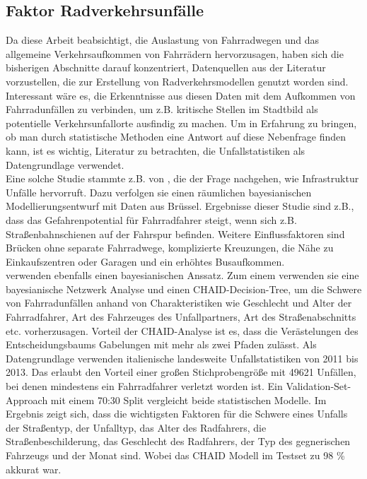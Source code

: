 \documentclass[a4paper,12pt]{thesis}
\begin{document}
\subsection{Faktor Radverkehrsunfälle}

Da diese Arbeit beabsichtigt, die Auslastung von Fahrradwegen und das allgemeine Verkehrsaufkommen von Fahrrädern hervorzusagen, haben sich die bisherigen Abschnitte darauf konzentriert, Datenquellen aus der Literatur vorzustellen, die zur Erstellung von Radverkehrsmodellen genutzt worden sind. Interessant wäre es, die Erkenntnisse aus diesen Daten mit dem Aufkommen von Fahrradunfällen zu verbinden, um z.B. kritische Stellen im Stadtbild als potentielle Verkehrsunfallorte ausfindig zu machen. Um in Erfahrung zu bringen, ob man durch statistische Methoden eine Antwort auf diese Nebenfrage finden kann, ist es wichtig, Literatur zu betrachten, die Unfallstatistiken als Datengrundlage verwendet.\\
Eine solche Studie stammte z.B. von \cite{Vandenbulcke2014}, die der Frage nachgehen, wie Infrastruktur Unfälle hervorruft. Dazu verfolgen sie einen räumlichen bayesianischen Modellierungsentwurf mit Daten aus Brüssel. Ergebnisse dieser Studie sind z.B., dass das Gefahrenpotential für Fahrradfahrer steigt, wenn sich z.B. Straßenbahnschienen auf der Fahrspur befinden. Weitere Einflussfaktoren sind Brücken ohne separate Fahrradwege, komplizierte Kreuzungen, die Nähe zu Einkaufszentren oder Garagen und ein erhöhtes Busaufkommen.\\
\cite{PRATI201744} verwenden ebenfalls einen bayesianischen Anssatz. Zum einem verwenden sie eine bayesianische Netzwerk Analyse und einen CHAID-Decision-Tree, um die Schwere von Fahrradunfällen anhand von Charakteristiken wie Geschlecht und Alter der Fahrradfahrer, Art des Fahrzeuges des Unfallpartners, Art des Straßenabschnitts etc. vorherzusagen. Vorteil der CHAID-Analyse ist es, dass die Verästelungen des Entscheidungsbaums Gabelungen mit mehr als zwei Pfaden zulässt. Als Datengrundlage verwenden \cite{PRATI201744} italienische landesweite Unfallstatistiken von 2011 bis 2013. Das erlaubt den Vorteil einer großen Stichprobengröße mit 49621 Unfällen, bei denen mindestens ein Fahrradfahrer verletzt worden ist. Ein Validation-Set-Approach mit einem 70:30 Split vergleicht beide statistischen Modelle. Im Ergebnis zeigt sich, dass die wichtigsten Faktoren für die Schwere eines Unfalls der Straßentyp, der Unfalltyp, das Alter des Radfahrers, die Straßenbeschilderung, das Geschlecht des Radfahrers, der Typ des gegnerischen Fahrzeugs und der Monat sind. Wobei das CHAID Modell im Testset zu 98 \% akkurat war.\\
\end{document}
